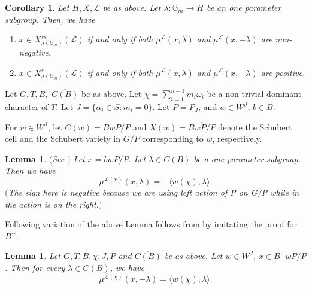 \documentclass[12pt,reqno]{amsart}
\numberwithin{equation}{section}
\newtheorem{corollary}[theorem]{Corollary}
\newtheorem{lemma}[theorem]{Lemma}
\theoremstyle{definition}
\begin{document}
\begin{corollary} Let $H,X, \mathcal{L}$ be as above. Let $\lambda :\mathbb{G}_{m}\rightarrow H$ be an one parameter subgroup. Then, we have 
\begin{enumerate}
	\item $x\in X^{ss}_{\lambda(\mathbb{G}_{m})}(\mathcal{L})$  if and only if both $\mu^{\mathcal{L}}(x,\lambda)$ and $\mu^{\mathcal{L}}(x,-\lambda)$ are non-negative.
	\item $x\in X^{s}_{\lambda(\mathbb{G}_{m})}(\mathcal{L})$ if and only if both $\mu^{\mathcal{L}}(x,\lambda)$ and $\mu^{\mathcal{L}}(x,-\lambda)$ are positive.
\end{enumerate}
\label{HM theorem}
\end{corollary}
Let $G, T, B,$ $\overline{C(B)}$ be as above.
Let $\chi=\displaystyle\sum_{i=1}^{n-1}m_{i}\omega_{i}$ be a non trivial dominant character of $T$. Let $J=\{\alpha_{i}\in S:m_{i}=0\}$. Let $P=P_{J}$, and $w\in W^{J}$, $b\in B$.

For $w\in W^{J}$, let $C(w)=BwP/P$ and $X(w)=\overline{BwP/P}$ denote the Schubert cell and the Schubert variety in $G/P$ corresponding to $w$, respectively.
\begin{lemma}$($See \cite[Lemma 5.1]{Ses2}$)$
Let $x=bwP/P$. 
Let $\lambda\in \overline{C(B)}$ be a one parameter subgroup. Then we have \[\mu^{\mathcal{L}(\chi)}(x,\lambda)=-\langle w(\chi),\lambda\rangle.\]
$($The sign here is negative because we are using left action of P on G/P while in \cite[Lemma 5.1]{Ses2}  the action is on the right.$)$
\label{CSS}
\end{lemma}
	Following variation of the above Lemma follows from   \cite[Lemma 5.1]{Ses2} by imitating the proof for $B^{-}$.
\begin{lemma}	\label{variation of Seshadri's lemma}
	Let $G,T,B,\chi,J, P$ and $\overline{C(B)}$ be as above. Let $w\in W^{J}$, $x\in B^{-}wP/P$. Then for every $\lambda\in \overline{C(B)}$, we have \[\mu^{\mathcal{L}(\chi)}(x,-\lambda)=\langle w(\chi),\lambda\rangle.\]
\end{lemma}
\end{document}
